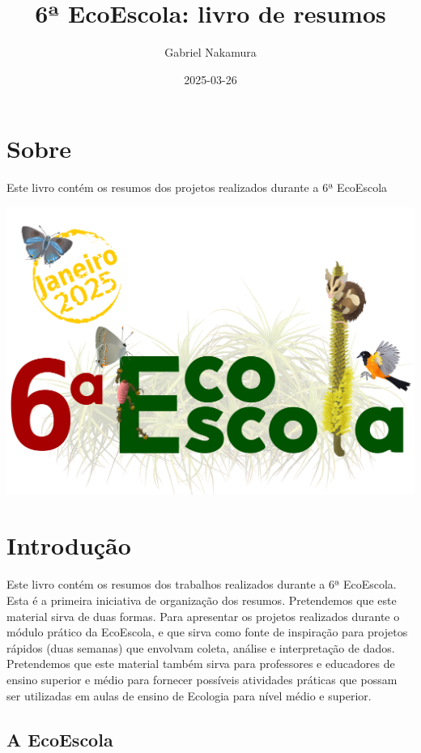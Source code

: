 \documentclass[
]{book}
\title{6ª EcoEscola: livro de resumos}
\author{Gabriel Nakamura}
\date{2025-03-26}
\begin{document}
\maketitle

{
\setcounter{tocdepth}{1}
\tableofcontents
}
\chapter{Sobre}\label{sobre}

Este livro contém os resumos dos projetos realizados durante a 6ª EcoEscola

\includegraphics{figs/ecoescolalogo.png}

\chapter{Introdução}\label{introduuxe7uxe3o}

Este livro contém os resumos dos trabalhos realizados durante a 6ª EcoEscola.
Esta é a primeira iniciativa de organização dos resumos. Pretendemos que este
material sirva de duas formas. Para apresentar os projetos realizados durante
o módulo prático da EcoEscola, e que sirva como fonte de inspiração para projetos
rápidos (duas semanas) que envolvam coleta, análise e interpretação de dados.
Pretendemos que este material também sirva para professores e educadores de
ensino superior e médio para fornecer possíveis atividades práticas que possam
ser utilizadas em aulas de ensino de Ecologia para nível médio e superior.

\section{A EcoEscola}\label{a-ecoescola}
\end{document}
